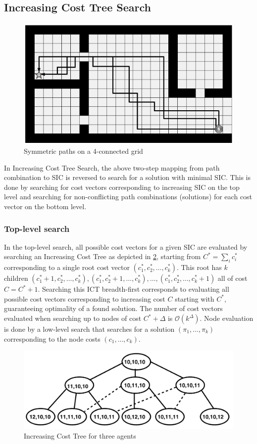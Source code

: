 \documentclass[english]{article}
\begin{document}
	\subsection{Increasing Cost Tree Search}
	\label{icts}
	\begin{figure}[t]
		\centering
		\includegraphics[width=0.4\linewidth]{img/symmetries}
		\caption{Symmetric paths on a 4-connected grid\cite{harabor2010}}
		\label{fig:symmetries}
	\end{figure}
	In Increasing Cost Tree Search\cite{sharon2011}, the above two-step mapping from path combination to SIC is reversed to search for a solution with minimal SIC. This is done by searching for cost vectors corresponding to increasing SIC on the top level and searching for non-conflicting path combinations (solutions) for each cost vector on the bottom level. 
	
	\subsubsection{Top-level search}
	In the top-level search, all possible cost vectors for a given SIC are evaluated by searching an Increasing Cost Tree as depicted in \ref{fig:ict}, starting from $C^* = \sum_i c^*_i$ corresponding to a single root cost vector $(c^*_1,c^*_2,\ldots,c^*_k)$. This root has $k$ children $(c^*_1 + 1,c^*_2,\ldots,c^*_k),(c^*_1,c^*_2 + 1,\ldots,c^*_k),\ldots,(c^*_1,c^*_2,\ldots,c^*_k + 1)$ all of cost $C = C^* + 1$. Searching this ICT breadth-first corresponds to evaluating all possible cost vectors corresponding to increasing cost $C$ starting with $C^*$, guaranteeing optimality of a found solution. The number of cost vectors evaluated when searching up to nodes of cost $C^* + \Delta$ is $\mathcal{O}(k^\Delta)$. Node evaluation is done by a low-level search that searches for a solution $(\pi_1,\ldots,\pi_k)$ corresponding to the node costs $(c_1,\ldots,c_k)$.
	
	\begin{figure}[t]
		\centering
		\includegraphics[width=0.7\linewidth]{img/ict}
		\caption{Increasing Cost Tree for three agents \cite{sharon2011}}
		\label{fig:ict}
	\end{figure}
	\begin{figure}
		
	\end{figure}
	
\end{document}
